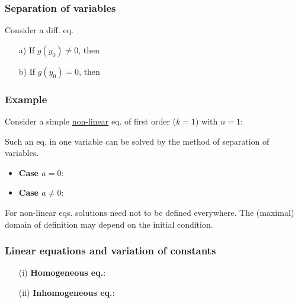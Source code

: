 \documentclass[10pt]{beamer}
\begin{document}
{\begin{frame}\frametitle{Separation of variables}
Consider a diff. eq.
\begin{block}{}
\vspace{0.8cm}
\end{block}
\vspace{0.5cm}

\begin{itemize}
\item[a)] If $g(y_0) \neq 0$, then\\
\vspace{2cm}
\item[b)] If $g(y_0) = 0$, then\\
\vspace{2cm}
\end{itemize}
\end{frame}

\begin{frame}\frametitle{Example}
Consider a simple \underline{non-linear} eq. of first order ($k=1$) with $n=1$:
\begin{block}{}
\vspace{1cm}
\end{block}
Such an eq. in one variable can be solved by the method of separation of variables.
\begin{itemize}
\item \textbf{Case $a=0$}:\\
\vspace{0.2cm}
\item \textbf{Case $a\neq 0$}:\\
\vspace{3cm}
\end{itemize}
For non-linear eqs. solutions need not to be defined everywhere. The (maximal) domain of definition may depend on the initial condition.
\end{frame}

\begin{frame}\frametitle{Linear equations and variation of constants}
\begin{itemize}
\item[(i)] \textbf{Homogeneous eq.}:\\
\vspace{0.3cm}
\item[(ii)]\textbf{Inhomogeneous eq.}:\\
\vspace{6cm}
\end{itemize}
\end{frame}


}
\end{document}
